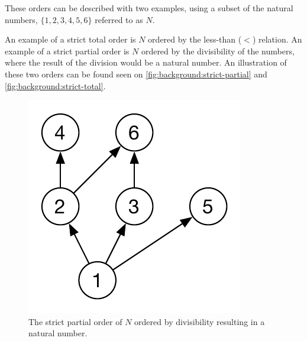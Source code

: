 		These orders can be described with two examples, using a subset of the natural numbers, $\{1, 2, 3, 4, 5, 6\}$ referred to as $N$. 
		
		An example of a strict total order is $N$ ordered by the less-than ($<$) relation. An example of a strict partial order is $N$ ordered by the divisibility of the numbers, where the result of the division would be a natural number. An illustration of these two orders can be found seen on \autoref{fig:background:strict-partial} and \autoref{fig:background:strict-total}.
	
		\begin{figure}[H]
		\centering
		\begin{minipage}{0.45\textwidth}
			\centering
			\includegraphics[height=\textheight/5]{2background/images/strict-partial.pdf}
		\caption{The strict partial order of $N$ ordered by divisibility resulting in a natural number.}
		\label{fig:background:strict-partial}
		\end{minipage}\hfill
		\begin{minipage}{0.45\textwidth}
			\centering

\end{minipage}
\end{figure}

